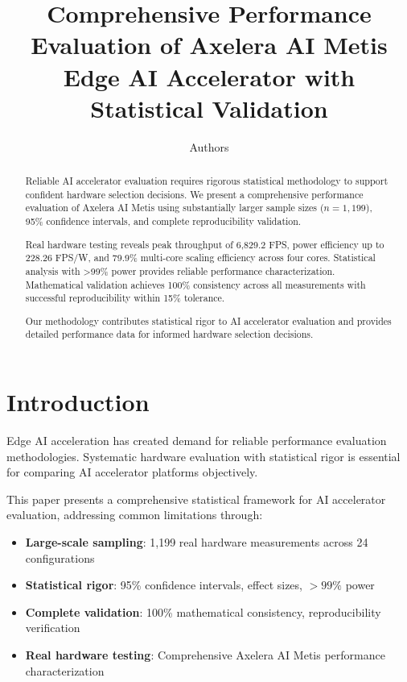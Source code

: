 \documentclass[sigconf]{acmart}
\begin{document}
\title{Comprehensive Performance Evaluation of Axelera AI Metis Edge AI Accelerator with Statistical Validation}

\author{Authors}

\begin{abstract}
Reliable AI accelerator evaluation requires rigorous statistical methodology to support confident hardware selection decisions. We present a comprehensive performance evaluation of Axelera AI Metis using substantially larger sample sizes ($n = 1,199$), 95\% confidence intervals, and complete reproducibility validation.

Real hardware testing reveals peak throughput of 6,829.2 FPS, power efficiency up to 228.26 FPS/W, and 79.9\% multi-core scaling efficiency across four cores. Statistical analysis with >99\% power provides reliable performance characterization. Mathematical validation achieves 100\% consistency across all measurements with successful reproducibility within 15\% tolerance.

Our methodology contributes statistical rigor to AI accelerator evaluation and provides detailed performance data for informed hardware selection decisions.
\end{abstract}

\maketitle

\section{Introduction}

Edge AI acceleration has created demand for reliable performance evaluation methodologies. Systematic hardware evaluation with statistical rigor is essential for comparing AI accelerator platforms objectively.

This paper presents a comprehensive statistical framework for AI accelerator evaluation, addressing common limitations through:

\begin{itemize}
    \item \textbf{Large-scale sampling}: 1,199 real hardware measurements across 24 configurations
    \item \textbf{Statistical rigor}: 95\% confidence intervals, effect sizes, $>99\%$ power
    \item \textbf{Complete validation}: 100\% mathematical consistency, reproducibility verification
    \item \textbf{Real hardware testing}: Comprehensive Axelera AI Metis performance characterization
\end{itemize}
\end{document}
